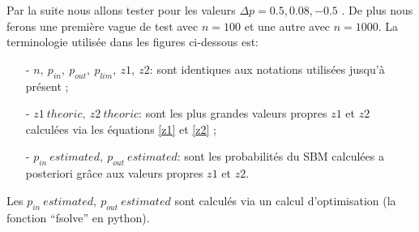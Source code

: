 Par la suite nous allons tester pour les valeurs $\Delta p= 0.5, 0.08, -0.5$ .
De plus nous ferons une première vague de test avec $n=100$ et une autre avec $n=1000$.
La terminologie utilisée dans les figures ci-dessous est:
\begin{itemize}
	\item[- \underline{$n,\: p_{in},\: p_{out},\: p_{lim},\: z1,\: z2$}:] sont identiques aux notations utilisées jusqu'à présent ;
	\item[- \underline{$z1\: theoric, \:z2\: theoric$}:] sont les plus grandes valeurs propres $z1$ et $z2$ calculées via les équations \eqref{z1} et \eqref{z2} ;    
	\item[- \underline{$p_{in}\: estimated, \:p_{out}\: estimated$}:] sont les probabilités du SBM calculées a posteriori grâce aux valeurs propres $z1$ et $z2$.\\
\end{itemize}
Les $p_{in}\: estimated, \:p_{out}\: estimated$ sont calculés via un calcul d'optimisation (la fonction ``fsolve'' en python).

